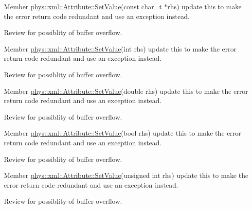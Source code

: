 \label{todo__todo000036}
\hypertarget{todo__todo000036}{}
 
\begin{DoxyDescription}
\item[Member \hyperlink{classphys_1_1xml_1_1Attribute_a470512fcd8b4f7609319bf85df100aaa}{phys::xml::Attribute::SetValue}(const char\_\-t $\ast$rhs) ]update this to make the error return code redundant and use an exception instead. 

Review for possiblity of buffer overflow. 
\end{DoxyDescription}

\label{todo__todo000037}
\hypertarget{todo__todo000037}{}
 
\begin{DoxyDescription}
\item[Member \hyperlink{classphys_1_1xml_1_1Attribute_a693f7bd8015866c3c4979101c343ce50}{phys::xml::Attribute::SetValue}(int rhs) ]update this to make the error return code redundant and use an exception instead. 

Review for possiblity of buffer overflow. 
\end{DoxyDescription}

\label{todo__todo000039}
\hypertarget{todo__todo000039}{}
 
\begin{DoxyDescription}
\item[Member \hyperlink{classphys_1_1xml_1_1Attribute_a919034671f61ee408d616409a49dafca}{phys::xml::Attribute::SetValue}(double rhs) ]update this to make the error return code redundant and use an exception instead. 

Review for possiblity of buffer overflow. 
\end{DoxyDescription}

\label{todo__todo000040}
\hypertarget{todo__todo000040}{}
 
\begin{DoxyDescription}
\item[Member \hyperlink{classphys_1_1xml_1_1Attribute_a6df4cf0f083482e69e4e6e94599a1d82}{phys::xml::Attribute::SetValue}(bool rhs) ]update this to make the error return code redundant and use an exception instead. 

Review for possiblity of buffer overflow. 
\end{DoxyDescription}

\label{todo__todo000038}
\hypertarget{todo__todo000038}{}
 
\begin{DoxyDescription}
\item[Member \hyperlink{classphys_1_1xml_1_1Attribute_a289ac36b218f3912224fd904ccade1ed}{phys::xml::Attribute::SetValue}(unsigned int rhs) ]update this to make the error return code redundant and use an exception instead. 

Review for possiblity of buffer overflow. 
\end{DoxyDescription}

